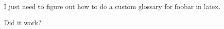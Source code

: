 \documentclass[czech,bachelor]{../../shared/diploma}
\begin{document}
\MakeTitlePages

\listoffigures
\clearpage










\printbibliography[title={Literatura}, heading=bibintoc]

\appendix
% 
I just need to figure out how to do a custom glossary for \gls{foobar} in latex.

\printglossaries
Did it work?
\end{document}
